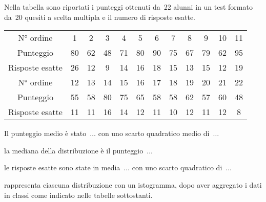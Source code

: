 \begin{esercizio}
\label{ese:A.45}
Nella tabella sono riportati i punteggi ottenuti da~22 alunni in un test 
formato da~20 quesiti a scelta multipla e il numero di risposte esatte.
\begin{center}
\begin{tabular}{cccccccccccc}
\toprule
N° ordine & 1 & 2 & 3 & 4 & 5 & 6 & 7 & 8 & 9 & 10 & 11 \\
Punteggio & 80 & 62 & 48 & 71 & 80 & 90 & 75 & 67 & 79 & 62 & 95 \\
Risposte esatte & 26 & 12 & 9 & 14 & 16 & 18 & 15 & 13 & 15 & 12 & 19 \\
\midrule
N° ordine & 12 & 13 & 14 & 15 & 16 & 17 & 18 & 19 & 20 & 21 & 22 \\
Punteggio & 55 & 58 & 80 & 75 & 65 & 58 & 58 & 62 & 57 & 60 & 48 \\
Risposte esatte & 11 & 11 & 16 & 14 & 12 & 11 & 10 & 12 & 11 & 12 & 8 \\
\bottomrule
\end{tabular}
\end{center}
\begin{enumeratea}
 \item Il punteggio medio è stato~\(\dots\) con uno scarto quadratico medio 
di~\(\dots\)
 \item la mediana della distribuzione è il punteggio~\(\dots\)
 \item le risposte esatte sono state in media~\(\dots\) con uno scarto 
quadratico di~\(\dots\)
 \item rappresenta ciascuna distribuzione con un istogramma, dopo aver 
aggregato i dati in classi come indicato nelle tabelle sottostanti.
\end{enumeratea}


\end{esercizio}
